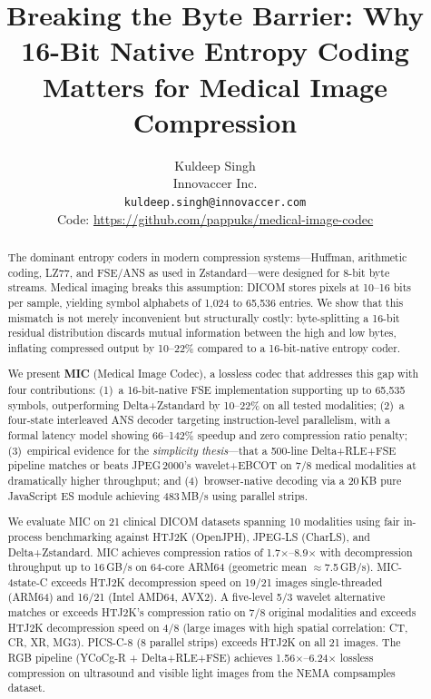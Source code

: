 \documentclass[10pt,twocolumn]{article}
\title{\textbf{Breaking the Byte Barrier: Why 16-Bit Native Entropy Coding Matters for Medical Image Compression}}
\author{
  Kuldeep Singh\\
  Innovaccer Inc.\\
  \texttt{kuldeep.singh@innovaccer.com}\\[4pt]
  \small Code: \url{https://github.com/pappuks/medical-image-codec}
}
\date{}
\begin{document}
\maketitle

\begin{abstract}
The dominant entropy coders in modern compression systems---Huffman, arithmetic coding, LZ77, and FSE/ANS as used in Zstandard---were designed for 8-bit byte streams. Medical imaging breaks this assumption: DICOM stores pixels at 10--16 bits per sample, yielding symbol alphabets of 1,024 to 65,536 entries. We show that this mismatch is not merely inconvenient but structurally costly: byte-splitting a 16-bit residual distribution discards mutual information between the high and low bytes, inflating compressed output by 10--22\% compared to a 16-bit-native entropy coder.

We present \textbf{MIC} (Medical Image Codec), a lossless codec that addresses this gap with four contributions: (1)~a 16-bit-native FSE implementation supporting up to 65,535 symbols, outperforming Delta+Zstandard by 10--22\% on all tested modalities; (2)~a four-state interleaved ANS decoder targeting instruction-level parallelism, with a formal latency model showing 66--142\% speedup and zero compression ratio penalty; (3)~empirical evidence for the \emph{simplicity thesis}---that a 500-line Delta+RLE+FSE pipeline matches or beats JPEG\,2000's wavelet+EBCOT on 7/8 medical modalities at dramatically higher throughput; and (4)~browser-native decoding via a 20\,KB pure JavaScript ES module achieving 483\,MB/s using parallel strips.

We evaluate MIC on 21 clinical DICOM datasets spanning 10 modalities using fair in-process benchmarking against HTJ2K (OpenJPH), JPEG-LS (CharLS), and Delta+Zstandard. MIC achieves compression ratios of 1.7$\times$--8.9$\times$ with decompression throughput up to 16\,GB/s on 64-core ARM64 (geometric mean $\approx$7.5\,GB/s). MIC-4state-C exceeds HTJ2K decompression speed on 19/21 images single-threaded (ARM64) and 16/21 (Intel AMD64, AVX2). A five-level 5/3 wavelet alternative matches or exceeds HTJ2K's compression ratio on 7/8 original modalities and exceeds HTJ2K decompression speed on 4/8 (large images with high spatial correlation: CT, CR, XR, MG3). PICS-C-8 (8 parallel strips) exceeds HTJ2K on all 21 images. The RGB pipeline (YCoCg-R + Delta+RLE+FSE) achieves 1.56$\times$--6.24$\times$ lossless compression on ultrasound and visible light images from the NEMA compsamples dataset.
\end{abstract}
\end{document}
